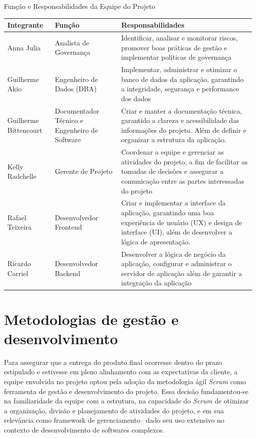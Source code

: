 \documentclass[
	12pt,				%
	openany,			%
	twoside,			%
	a4paper,			%
	english,			%
	french,				%
	spanish,			%
	brazil				%
	]{abntex2}
\begin{document}
\begin{quadro}[htb]
	\caption{Função e Responsabilidades da Equipe do Projeto}
	\label{quadro_funçao_responsabilidade}
	\begin{tabular}{|p{2.8cm}|p{5cm}|p{7.2cm}|}
		\hline
		\textbf{Integrante} & \textbf{Função} & \textbf{Responsabilidades} \\ \hline
		Anna Julia & Analista de Governança & Identificar, analisar e monitorar riscos, promover boas práticas de gestão e implementar políticas de governança \\ \hline
	
		Guilherme Akio & Engenheiro de Dados (DBA) & Implementar, administrar  e otimizar o banco de dados da aplicação, garantindo a integridade, segurança e performance dos dados \\ \hline
	
		Guilherme \quad Bittencourt & Documentador Técnico e Engenheiro de Software & Criar e manter a documentação técnica, garantido a clareza e acessibilidade das informações do projeto. Além de definir e organizar a estrutura da aplicação.\\ \hline
	
		Kelly Radchelle & Gerente de Projeto & Coordenar a equipe e gerenciar as atividades  do projeto, a fim de facilitar as tomadas de decisões e  assegurar a comunicação entre as partes interessadas do projeto   \\ \hline
		Rafael Teixeira & Desenvolvedor Frontend & Criar e implementar a interface da aplicação, garantindo uma boa  experiência de usuário (UX)  e design de interface (UI), além de desenvolver a lógica de apresentação.    \\ \hline
		Ricardo Carriel & Desenvolvedor Backend & Desenvolver a lógica de negócio da aplicação, configurar e administrar o servidor de aplicação  além de garantir a integração da aplicação  \\ \hline
	\end{tabular}
\end{quadro}
\section{Metodologias de gestão e desenvolvimento}
Para assegurar que a entrega do produto final ocorresse dentro do prazo estipulado e estivesse em pleno alinhamento com as expectativas da cliente, a equipe envolvida no projeto optou pela adoção da metodologia ágil \textit{Scrum} como ferramenta de gestão e desenvolvimento do projeto. Essa decisão fundamentou-se na familiaridade da equipe com a estrutura, na capacidade do \textit{Scrum} de otimizar a organização, divisão e planejamento de atividades do projeto, e em sua relevância como framework de gerenciamento– dado seu uso extensivo no contexto de desenvolvimento de softwares complexos.
\end{document}
